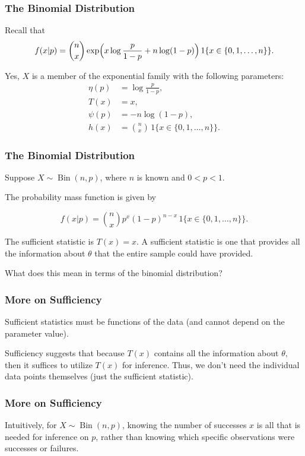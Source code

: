 \documentclass{beamer}
\begin{document}
\begin{frame}
\frametitle{The Binomial Distribution}

Recall that $$ f(x|p) = \binom{n}{x} \exp\Bigl( x\log\frac{p}{1-p} + n\log(1-p) \Bigr) \, 1\{x \in \{0,1,\dots,n\}\}.$$

Yes, $X$ is a member of the exponential family with the following parameters:
\begin{align*}
\eta(p) &= \log\frac{p}{1-p},\\[1mm]
T(x) &= x,\\[1mm]
\psi(p) &= -n\log(1-p),\\[1mm]
h(x) &= \binom{n}{x}\, 1\{x \in \{0,1,\dots,n\}\}.
\end{align*}
\end{frame}

\begin{frame}
\frametitle{The Binomial Distribution}
Suppose $X \sim \operatorname{Bin}(n,p)$, where $n$ is known and $0 < p < 1$.

The probability mass function is given by 

$$f(x|p) = \binom{n}{x} p^x (1-p)^{n-x} \, 1\{x \in \{0,1,\dots,n\}\}.$$
\vspace*{1em}

The sufficient statistic is $T(x) = x.$ A sufficient statistic is one that provides all the information about $\theta$ that the entire sample could have provided. 
\vspace*{1em}

What does this mean in terms of the binomial distribution?
\end{frame}

\begin{frame}
\frametitle{More on Sufficiency}
Sufficient statistics must be functions of the data (and cannot depend on the parameter value). 

\vspace*{1em}

Sufficiency suggests that because $T(x)$ contains all the information about $\theta,$ then it suffices to utilize $T(x)$ for inference. Thus, we don't need the individual data points themselves (just the sufficient statistic). 
\end{frame}


\begin{frame}
\frametitle{More on Sufficiency}
Intuitively, for $X \sim \operatorname{Bin}(n,p)$, knowing the number of successes $x$ is all that is needed for inference on $p$, rather than knowing which specific observations were successes or failures.
\end{frame}
\end{document}

